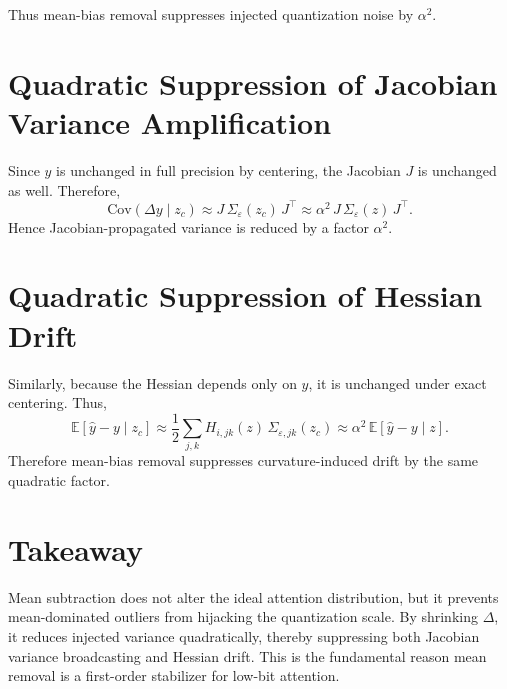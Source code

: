 Thus mean-bias removal suppresses injected quantization noise by $\alpha^2$.

\section{Quadratic Suppression of Jacobian Variance Amplification}

Since $y$ is unchanged in full precision by centering, the Jacobian $J$ is unchanged as well.
Therefore,
\begin{equation}
\mathrm{Cov}(\Delta y\mid z_c)
\approx
J\,\Sigma_\varepsilon(z_c)\,J^\top
\approx
\alpha^2\,J\,\Sigma_\varepsilon(z)\,J^\top.
\end{equation}
Hence Jacobian-propagated variance is reduced by a factor $\alpha^2$.

\section{Quadratic Suppression of Hessian Drift}

Similarly, because the Hessian depends only on $y$, it is unchanged under exact centering.
Thus,
\begin{equation}
\mathbb{E}[\hat y-y\mid z_c]
\approx
\frac12 \sum_{j,k} H_{i,jk}(z)\,\Sigma_{\varepsilon,jk}(z_c)
\approx
\alpha^2\,\mathbb{E}[\hat y-y\mid z].
\end{equation}
Therefore mean-bias removal suppresses curvature-induced drift by the same quadratic factor.

\section{Takeaway}

Mean subtraction does not alter the ideal attention distribution,
but it prevents mean-dominated outliers from hijacking the quantization scale.
By shrinking $\Delta$, it reduces injected variance quadratically,
thereby suppressing both Jacobian variance broadcasting and Hessian drift.
This is the fundamental reason mean removal is a first-order stabilizer for low-bit attention.